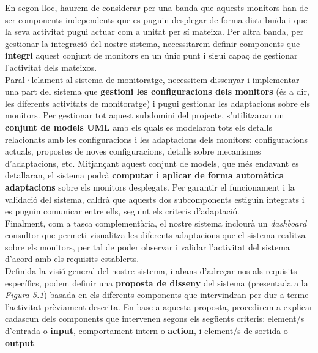 En segon lloc, haurem de considerar per una banda que aquests monitors han de ser components independents que es puguin desplegar de forma distribuïda i que la seva activitat pugui actuar com a unitat per sí mateixa. Per altra banda, per gestionar la integració del nostre sistema, necessitarem definir components que \textbf{integri} aquest conjunt de monitors en un únic punt i sigui capaç de gestionar l'activitat dels mateixos.\\

Paral·lelament al sistema de monitoratge, necessitem dissenyar i implementar una part del sistema que \textbf{gestioni les configuracions dels monitors} (és a dir, les diferents activitats de monitoratge) i pugui gestionar les adaptacions sobre els monitors. Per gestionar tot aquest subdomini del projecte, s'utilitzaran un \textbf{conjunt de models UML} amb els quals es modelaran tots els detalls relacionats amb les configuracions i les adaptacions dels monitors: configuracions actuals, propostes de noves configuracions, detalls sobre mecanismes d'adaptacions, etc. Mitjançant aquest conjunt de models, que més endavant es detallaran, el sistema podrà \textbf{computar i aplicar de forma automàtica adaptacions} sobre els monitors desplegats. Per garantir el funcionament i la validació del sistema, caldrà que aquests dos subcomponents estiguin integrats i es puguin comunicar entre ells, seguint els criteris d'adaptació.\\

Finalment, com a tasca complementària, el nostre sistema inclourà un \textit{dashboard} consultor que permeti visualitza les diferents adaptacions que el sistema realitza sobre els monitors, per tal de poder observar i validar l'activitat del sistema d'acord amb els requisits establerts.\\

Definida la visió general del nostre sistema, i abans d'adreçar-nos als requisits específics, podem definir una \textbf{proposta de disseny} del sistema (presentada a la \textit{Figura 5.1}) basada en els diferents components que intervindran per dur a terme l'activitat prèviament descrita. En base a aquesta proposta, procedirem a explicar cadascun dels components que intervenen segons els següents criteris: element/s d'entrada o \textbf{input}, comportament intern o \textbf{action}, i element/s de sortida o \textbf{output}.\\

